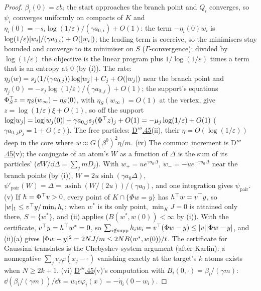 \begin{proof}
$\beta_i(0) = \varepsilon b_i$ the start approaches the branch point and $Q_i$ converges, so $\psi_i$ converges uniformly
on compacts of $K$ and $\eta_i(0) = -s_i\log(1/\varepsilon)/(\gamma a_{0,i}) + O(1)$: the term $-\eta_i(0)w_i$ is
$\log(1/\varepsilon)\lvert w_i\rvert/(\gamma a_{0,i}) + O(\lvert w_i\rvert)$; the leading term is coercive, so the minimisers stay
bounded and converge to its minimiser on $S$ ($\Gamma$-convergence); divided by $\log(1/\varepsilon)$ the objective is
the linear program plus $1/\log(1/\varepsilon)$ times a term that is an entropy at 0 (by (i)). The rate:
$\eta_j(w) = s_j(1/(\gamma a_{0,j}))\log\lvert w_j\rvert + C_j + O(\lvert w_j\rvert)$ near the branch point and
$\eta_j(0) = -s_j\log(1/\varepsilon)/(\gamma a_{0,j}) + O(1)$; the support's equations
$\Phi_S^\top z = \eta_S(w_\infty) - \eta_S(0)$, with $\eta_S(w_\infty) = O(1)$ at the vertex, give
$z = \log(1/\varepsilon)\xi + O(1)$, so off the support
$\log\lvert w_j\rvert = \log\lvert w_j(0)\rvert + \gamma a_{0,j}s_j(\Phi^\top z)_j + O(1) = -\mu_j\log(1/\varepsilon) + O(1)$
($\gamma a_{0,j}\rho_j = 1 + O(\varepsilon)$). The free particles: \hyperref[res:thmDppp:45]{D$'''$.45}(ii), their
$\eta = O(\log(1/\varepsilon))$ deep in the core where $w\approx G(\beta^0)^2\eta/m$. (iv) The common increment is
\hyperref[res:thmDppp:45]{D$'''$.45}(v); the conjugate of an atom's $W$ as a function of $\Delta$ is the sum of its
particles' ($\dd W/\dd\Delta = \sum_jmD_j$). With $w_+ = ue^{\gamma a_0\Delta}$, $w_- = -ue^{-\gamma a_0\Delta}$ near the
branch points (by (i)), $W = 2u\sinh(\gamma a_0\Delta)$,
$\psi'_{\mathrm{pair}}(W) = \Delta = \operatorname{asinh}(W/(2u))/(\gamma a_0)$, and one integration gives
$\psi_{\mathrm{pair}}$. (v) If $h = \Phi^\top v > 0$, every point of $K\cap\{\Phi w = y\}$ has $h^\top w = v^\top y$, so
$\lvert w\rvert_1\le v^\top y/\min_ih_i$; when $w^*$ is its only point, $\min_KJ = 0$ is attained only there, $S = \{w^*\}$, and
(ii) applies ($B(w^*,w(0)) < \infty$ by (i)). With the certificate, $v^\top y = h^\top w^* = 0$, so
$\sum_{i\notin\operatorname{supp}}h_iw_i = v^\top(\Phi w - y)\le\lvert v\rvert\lvert \Phi w - y\rvert$, and (ii)(a) gives
$\lvert \Phi w - y\rvert^2 = 2NJ/m\le2NB(w^*,w(0))/t$. The certificate for Gaussian translates is the Chebyshev-system argument
(after Karlin): a nonnegative $\sum_jv_j\varphi(x_j - \cdot)$ vanishing exactly at the target's $k$ atoms exists when
$N\ge2k + 1$. (vi) \hyperref[res:thmDppp:45]{D$'''$.45}(v)'s computation with $B_i(0,\cdot) = \beta_i/(\gamma m)$:
$\dd(\beta_i/(\gamma m))/\dd t = w_ie\varphi_i(x) = -\dot\eta_i(0 - w_i)$.
\end{proof}
